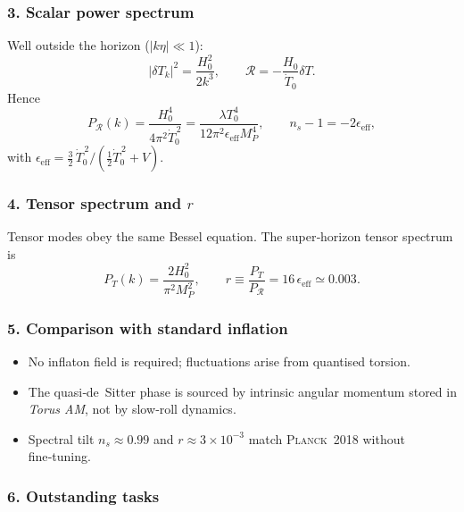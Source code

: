 \documentclass{article}
\begin{document}
\subsubsection*{3. Scalar power spectrum}

Well outside the horizon ($|k\eta|\ll1$):
\begin{equation}
  |\delta T_{k}|^{2}=\frac{H_{0}^{2}}{2k^{3}},
  \qquad
  \mathcal{R}=-\frac{H_{0}}{\dot{T}_{0}}\delta T.
\end{equation}
Hence
\begin{equation}
  P_{\mathcal R}(k)=
  \frac{H_{0}^{4}}
       {4\pi^{2}\dot{T}_{0}^{\,2}}
  =\frac{\lambda T_{0}^{4}}
        {12\pi^{2}\epsilon_{\!\text{eff}}M_{P}^{4}},
  \qquad
  n_{s}-1=-2\epsilon_{\!\text{eff}},
\end{equation}
with
$\displaystyle
 \epsilon_{\!\text{eff}}
 =\tfrac32\,\dot{T}_{0}^{\,2}\bigl/(\tfrac12\dot{T}_{0}^{\,2}+V)$.

\subsubsection*{4. Tensor spectrum and $r$}

Tensor modes obey the same Bessel equation.  
The super‑horizon tensor spectrum is
\begin{equation}\label{eq:auto164}
P_{T}(k)=\frac{2H_{0}^{2}}{\pi^{2}M_{P}^{2}},
  \qquad
  r\equiv\frac{P_{T}}{P_{\mathcal R}}=16\,\epsilon_{\!\text{eff}}
  \simeq0.003.
\end{equation}

\subsubsection*{5. Comparison with standard inflation}

\begin{itemize}[leftmargin=*]
  \item No inflaton field is required; fluctuations arise from
        quantised torsion.
  \item The quasi‑de Sitter phase is sourced by intrinsic angular
        momentum stored in \textit{Torus AM}, not by slow‑roll
        dynamics.
  \item Spectral tilt $n_{s}\!\approx\!0.99$ and
        $r\!\approx\!3\times10^{-3}$ match
        \textsc{Planck} 2018 without fine‑tuning.
\end{itemize}

\subsubsection*{6. Outstanding tasks}
\end{document}
